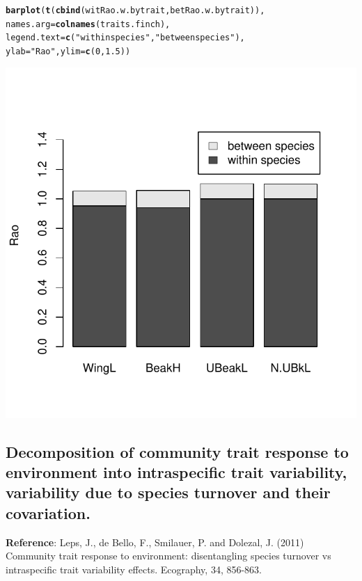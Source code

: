 \documentclass[12pt]{article}\usepackage[]{graphicx}\usepackage[]{color}
\makeatletter
\def\maxwidth{ %
  \ifdim\Gin@nat@width>\linewidth
    \linewidth
  \else
    \Gin@nat@width
  \fi
}
\newcommand{\hlnum}[1]{\textcolor[rgb]{0.686,0.059,0.569}{#1}}%
\newcommand{\hlstr}[1]{\textcolor[rgb]{0.192,0.494,0.8}{#1}}%
\newcommand{\hlstd}[1]{\textcolor[rgb]{0.345,0.345,0.345}{#1}}%
\newcommand{\hlkwc}[1]{\textcolor[rgb]{0.333,0.667,0.333}{#1}}%
\newcommand{\hlkwd}[1]{\textcolor[rgb]{0.737,0.353,0.396}{\textbf{#1}}}%
\newenvironment{kframe}{%
 \def\at@end@of@kframe{}%
 \ifinner\ifhmode%
  \def\at@end@of@kframe{\end{minipage}}%
  \begin{minipage}{\columnwidth}%
 \fi\fi%
 \def\FrameCommand##1{\hskip\@totalleftmargin \hskip-\fboxsep
 \colorbox{shadecolor}{##1}\hskip-\fboxsep
     \hskip-\linewidth \hskip-\@totalleftmargin \hskip\columnwidth}%
 \MakeFramed {\advance\hsize-\width
   \@totalleftmargin\z@ \linewidth\hsize
   \@setminipage}}%
 {\par\unskip\endMakeFramed%
 \at@end@of@kframe}
\newenvironment{knitrout}{}{} %
\makeatother
\begin{document}
\begin{knitrout}
\color{fgcolor}\begin{kframe}
\begin{alltt}
\hlkwd{barplot}\hlstd{(}\hlkwd{t}\hlstd{(}\hlkwd{cbind}\hlstd{( witRao.w.bytrait, betRao.w.bytrait)),}
        \hlkwc{names.arg} \hlstd{=} \hlkwd{colnames}\hlstd{(traits.finch),}
        \hlkwc{legend.text}\hlstd{=}\hlkwd{c}\hlstd{(}\hlstr{"within species"}\hlstd{,} \hlstr{"between species"}\hlstd{),}
        \hlkwc{ylab}\hlstd{=}\hlstr{"Rao"}\hlstd{,} \hlkwc{ylim}\hlstd{=}\hlkwd{c}\hlstd{(}\hlnum{0}\hlstd{,}\hlnum{1.5}\hlstd{))}
\end{alltt}
\end{kframe}
\includegraphics[width=\maxwidth]{figure/unnamed-chunk-21} 

\end{knitrout}


\subsection{Decomposition of community trait response to environment into intraspecific trait variability, variability due to species turnover and their covariation.}

\textbf{Reference}: Leps, J., de Bello, F., Smilauer, P. and Dolezal, J. (2011) Community trait response to environment: disentangling species turnover vs intraspecific trait variability effects. Ecography, 34, 856-863.
\end{document}
